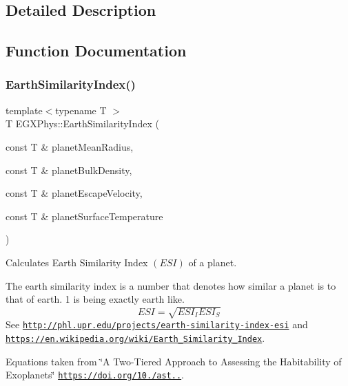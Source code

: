 \subsection{Detailed Description}


\subsection{Function Documentation}
\mbox{\label{group___e_g_x_phys-_planet_criteria_ga4b86397b1c839c49ac599d49fda207d4}} 
\subsubsection{\texorpdfstring{Earth\+Similarity\+Index()}{EarthSimilarityIndex()}}
{\footnotesize\ttfamily template$<$typename T $>$ \\
T E\+G\+X\+Phys\+::\+Earth\+Similarity\+Index (\begin{DoxyParamCaption}\item[{const T \&}]{planet\+Mean\+Radius,  }\item[{const T \&}]{planet\+Bulk\+Density,  }\item[{const T \&}]{planet\+Escape\+Velocity,  }\item[{const T \&}]{planet\+Surface\+Temperature }\end{DoxyParamCaption})}



Calculates Earth Similarity Index $(ESI)$ of a planet. 

The earth similarity index is a number that denotes how similar a planet is to that of earth. 1 is being exactly earth like. \[ESI=\sqrt{ESI_I ESI_S}\] See \href{http://phl.upr.edu/projects/earth-similarity-index-esi}{\tt http\+://phl.\+upr.\+edu/projects/earth-\/similarity-\/index-\/esi} and \href{https://en.wikipedia.org/wiki/Earth_Similarity_Index}{\tt https\+://en.\+wikipedia.\+org/wiki/\+Earth\+\_\+\+Similarity\+\_\+\+Index}.

Equations taken from \char`\"{}\+A Two-\/\+Tiered Approach to Assessing the Habitability of Exoplanets\char`\"{} \href{https://doi.org/10.1089/ast.2010.0592}{\tt https\+://doi.\+org/10./ast..}.


